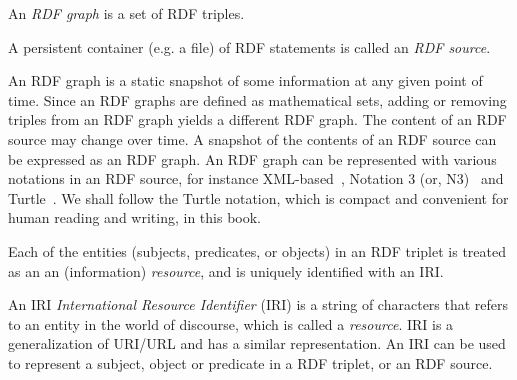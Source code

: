\begin{definition}
	An {\em RDF graph} is a set of RDF triples. 
\end{definition}

\begin{definition} 
	A persistent container (e.g. a file) of RDF statements is called an {\em RDF source}.
\end{definition}

\noindent
{}  
An RDF graph is a static snapshot of some information at any given point of time. Since an RDF graphs are defined as mathematical 
sets, adding or removing triples from an RDF graph yields a different RDF graph. The content of an RDF source may change over time. 
A snapshot of the contents of an RDF source can be expressed as an RDF graph. 
%
An RDF graph can be represented with various notations in an RDF source, for instance XML-based~\citep{RDF-XML:2014}, Notation 3 
(or, N3)~\citep{Berners-Lee:2011} and Turtle~\citep{Turtle:2011}. We shall follow the Turtle notation, which is compact and convenient 
for human reading and writing, in this book. 

Each of the entities (subjects, predicates, or objects) in an RDF triplet is treated as an an (information) {\em resource}, and is 
uniquely identified with an IRI.

\begin{definition} 
	An IRI {\em International Resource Identifier} (IRI) is a string of characters that refers to an entity in the world of 
	discourse, which is called a {\em resource}. IRI is a generalization of URI/URL and has a similar representation. 
	An IRI can be used to represent a subject, object or predicate in a RDF triplet, or an RDF source.
\end{definition}

